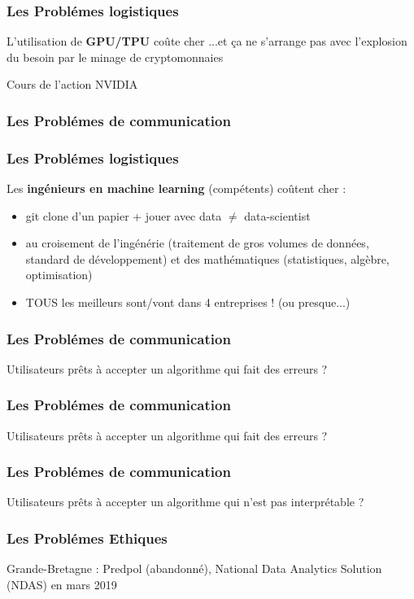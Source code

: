 \documentclass{formation}
\begin{document}
\begin{frame}
  \frametitle{Les Problémes logistiques}
  L'utilisation de \textbf{GPU/TPU} coûte cher
  \newline
  ...et ça ne s'arrange pas avec l'explosion du besoin par le minage de cryptomonnaies
  \begin{center}
    \small Cours de l'action NVIDIA
  \end{center}
\end{frame}

\begin{frame}
\frametitle{Les Problémes de communication}
\end{frame}

\begin{frame}
  \frametitle{Les Problémes logistiques}
  Les \textbf{ingénieurs en machine learning} (compétents) coûtent cher :
  \begin{itemize}
  \item git clone d'un papier + jouer avec data $\neq$ data-scientist
  \item au croisement de l'ingénérie (traitement de gros volumes de données, standard de développement) et des mathématiques (statistiques, algèbre, optimisation)
  \item TOUS les meilleurs sont/vont dans 4 entreprises ! (ou presque...)
  \end{itemize}
\end{frame}

\begin{frame}
  \frametitle{Les Problémes de communication}
  Utilisateurs prêts à accepter un algorithme qui fait des erreurs ?
\end{frame}

\begin{frame}
  \frametitle{Les Problémes de communication}
  Utilisateurs prêts à accepter un algorithme qui fait des erreurs ?
\end{frame}

\begin{frame}
  \frametitle{Les Problémes de communication}
  Utilisateurs prêts à accepter un algorithme qui n'est pas interprétable ?
\end{frame}

\begin{frame}
  \frametitle{Les Problémes Ethiques}
  Grande-Bretagne : Predpol (abandonné),  National Data Analytics Solution (NDAS) en mars 2019
\end{frame}
\end{document}
